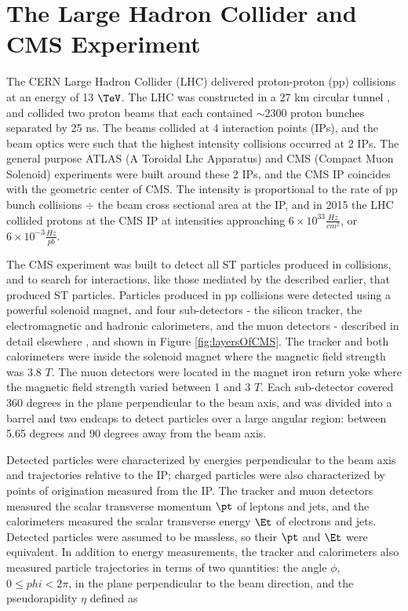 \chapter{The Large Hadron Collider and CMS Experiment}
\label{sec:experiment_chapter}
The CERN Large Hadron Collider (LHC) delivered proton-proton (pp) collisions at an energy of 13 $\TeV$.  The LHC 
was constructed in a 27 km circular tunnel \cite{lhcTDR}, and collided two proton beams that each contained 
$\sim$2300 proton bunches separated by 25 ns.  The beams collided at 4 interaction points (IPs), and the beam optics 
were such that the highest intensity collisions occurred at 2 IPs.  The general purpose ATLAS 
(A Toroidal Lhc Apparatus) \cite{atlasTdrPhysPerformance} and CMS (Compact Muon Solenoid) \cite{cmsTdrPhysPerformance} 
experiments were built around these 2 IPs, and the CMS IP coincides with the geometric center of CMS.  The 
intensity is proportional to the rate of pp bunch collisions $\div$ the beam cross sectional area at the IP, 
and in 2015 the LHC collided protons at the CMS IP at intensities approaching $6 \times 10^{33} \frac{Hz}{cm^{2}}$, 
or $6 \times 10^{-3} \frac{Hz}{pb}$.

The CMS experiment was built to detect all ST particles produced in collisions, and to search for interactions, like 
those mediated by the \WR described earlier, that produced ST particles.  Particles produced in pp collisions were 
detected using a powerful solenoid magnet, and four sub-detectors - the silicon tracker, the electromagnetic and 
hadronic calorimeters, and the muon detectors - described in detail elsewhere \cite{cmsDetectorPaper}, and shown in 
Figure \ref{fig:layersOfCMS}.  The tracker and both calorimeters were inside the solenoid magnet where the magnetic 
field strength was 3.8 $\unit{T}$.  The muon detectors were located in the magnet iron return yoke where the magnetic 
field strength varied between 1 and 3 $\unit{T}$.  Each sub-detector covered 360 degrees in the plane perpendicular 
to the beam axis, and was divided into a barrel and two endcaps to detect particles over a large angular region: 
between 5.65 degrees and 90 degrees away from the beam axis.

Detected particles were characterized by energies perpendicular to the beam axis and trajectories relative to the IP; 
charged particles were also characterized by points of origination measured from the IP.  The tracker and muon detectors 
measured the scalar transverse momentum $\pt$ of leptons and jets, and the calorimeters measured the scalar transverse 
energy $\Et$ of electrons and jets.  Detected particles were assumed to be massless, so their $\pt$ and $\Et$ were equivalent.  
In addition to energy measurements, the tracker and calorimeters also measured particle trajectories in terms of two 
quantities: the angle $\phi$, $0 \leq phi < 2\pi$, in the plane perpendicular to the beam direction, and the pseudorapidity 
$\eta$ defined as

